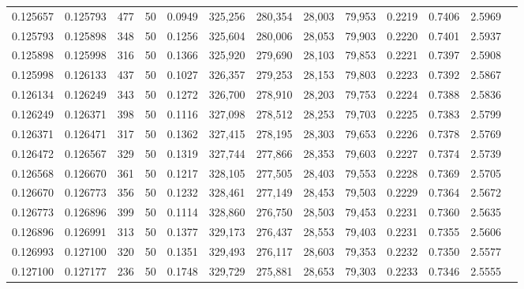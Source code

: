 \begin{tabular}{rrrrrrrrrrrrr}
0.125657 & 0.125793 &   477 &  50 &                                     0.0949 & 325,256 & 280,354 &  28,003 &  79,953 & 0.2219 & 0.7406 & 2.5969 \\
0.125793 & 0.125898 &   348 &  50 &                                     0.1256 & 325,604 & 280,006 &  28,053 &  79,903 & 0.2220 & 0.7401 & 2.5937 \\
0.125898 & 0.125998 &   316 &  50 &                                     0.1366 & 325,920 & 279,690 &  28,103 &  79,853 & 0.2221 & 0.7397 & 2.5908 \\
0.125998 & 0.126133 &   437 &  50 &                                     0.1027 & 326,357 & 279,253 &  28,153 &  79,803 & 0.2223 & 0.7392 & 2.5867 \\
0.126134 & 0.126249 &   343 &  50 &                                     0.1272 & 326,700 & 278,910 &  28,203 &  79,753 & 0.2224 & 0.7388 & 2.5836 \\
0.126249 & 0.126371 &   398 &  50 &                                     0.1116 & 327,098 & 278,512 &  28,253 &  79,703 & 0.2225 & 0.7383 & 2.5799 \\
0.126371 & 0.126471 &   317 &  50 &                                     0.1362 & 327,415 & 278,195 &  28,303 &  79,653 & 0.2226 & 0.7378 & 2.5769 \\
0.126472 & 0.126567 &   329 &  50 &                                     0.1319 & 327,744 & 277,866 &  28,353 &  79,603 & 0.2227 & 0.7374 & 2.5739 \\
0.126568 & 0.126670 &   361 &  50 &                                     0.1217 & 328,105 & 277,505 &  28,403 &  79,553 & 0.2228 & 0.7369 & 2.5705 \\
0.126670 & 0.126773 &   356 &  50 &                                     0.1232 & 328,461 & 277,149 &  28,453 &  79,503 & 0.2229 & 0.7364 & 2.5672 \\
0.126773 & 0.126896 &   399 &  50 &                                     0.1114 & 328,860 & 276,750 &  28,503 &  79,453 & 0.2231 & 0.7360 & 2.5635 \\
0.126896 & 0.126991 &   313 &  50 &                                     0.1377 & 329,173 & 276,437 &  28,553 &  79,403 & 0.2231 & 0.7355 & 2.5606 \\
0.126993 & 0.127100 &   320 &  50 &                                     0.1351 & 329,493 & 276,117 &  28,603 &  79,353 & 0.2232 & 0.7350 & 2.5577 \\
0.127100 & 0.127177 &   236 &  50 &                                     0.1748 & 329,729 & 275,881 &  28,653 &  79,303 & 0.2233 & 0.7346 & 2.5555 \\

\end{tabular}
